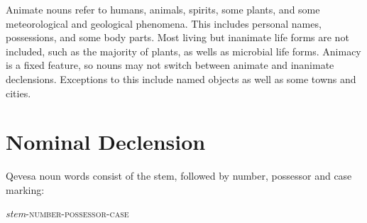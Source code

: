 \documentclass[grammar]{subfiles}
\begin{document}
Animate nouns refer to humans, animals, spirits, some plants, and some
meteorological and geological phenomena.  This includes personal names,
possessions, and some body parts.  Most living but inanimate life forms are
not included, such as the majority of plants, as wells as microbial life
forms.  Animacy is a fixed feature, so nouns may not switch between animate
and inanimate declensions.  Exceptions to this include named objects as well
as some towns and cities.









\section{Nominal Declension}
\label{sec:nm_declension}

Qevesa noun words consist of the stem, followed by number, possessor and case marking:

\begin{exe}
  \ex\label{ex:nm_structure} \textit{stem}\textsc{-number-possessor-case}
\end{exe}
\end{document}
